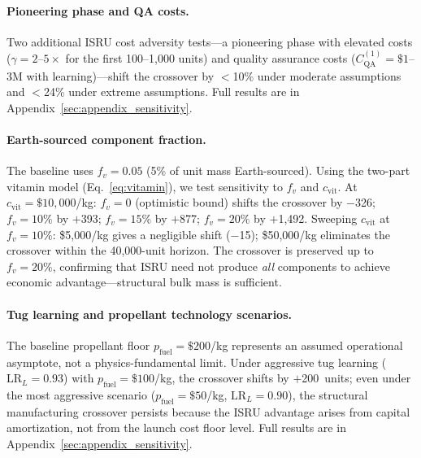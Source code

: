 \documentclass[preprint,12pt]{elsarticle}
\begin{document}
\paragraph{Pioneering phase and QA costs.} Two additional ISRU cost adversity tests---a pioneering phase with elevated costs ($\gamma = 2$--$5\times$ for the first 100--1{,}000 units) and quality assurance costs ($C_{\mathrm{QA}}^{(1)} = \$1$--$3$M with learning)---shift the crossover by $<$10\% under moderate assumptions and $<$24\% under extreme assumptions. Full results are in Appendix~\ref{sec:appendix_sensitivity}.

\paragraph{Earth-sourced component fraction.} The baseline uses $f_v = 0.05$ (5\% of unit mass Earth-sourced). Using the two-part vitamin model (Eq.~\ref{eq:vitamin}), we test sensitivity to $f_v$ and $c_{\mathrm{vit}}$. At $c_{\mathrm{vit}} = \$10{,}000$/kg: $f_v = 0$ (optimistic bound) shifts the crossover by $-$326; $f_v = 10\%$ by $+$393; $f_v = 15\%$ by $+$877; $f_v = 20\%$ by $+$1{,}492. Sweeping $c_{\mathrm{vit}}$ at $f_v = 10\%$: \$5{,}000/kg gives a negligible shift ($-$15); \$50{,}000/kg eliminates the crossover within the 40{,}000-unit horizon. The crossover is preserved up to $f_v = 20\%$, confirming that ISRU need not produce \emph{all} components to achieve economic advantage---structural bulk mass is sufficient.

\paragraph{Tug learning and propellant technology scenarios.} The baseline propellant floor $p_{\mathrm{fuel}} = \$200$/kg represents an assumed operational asymptote, not a physics-fundamental limit. Under aggressive tug learning ($\mathrm{LR}_L = 0.93$) with $p_{\mathrm{fuel}} = \$100$/kg, the crossover shifts by $+$200~units; even under the most aggressive scenario ($p_{\mathrm{fuel}} = \$50$/kg, $\mathrm{LR}_L = 0.90$), the structural manufacturing crossover persists because the ISRU advantage arises from capital amortization, not from the launch cost floor level. Full results are in Appendix~\ref{sec:appendix_sensitivity}.
\end{document}
